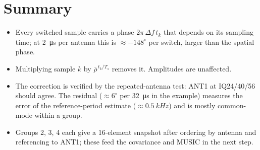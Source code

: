 \documentclass[11pt,a4paper]{article}
\begin{document}
\section{Summary}
\begin{itemize}
  \item Every switched sample carries a phase $2\pi\,\Delta f\,t_k$ that depends on its sampling time; at \SI{2}{\micro s} per antenna this is $\approx -148^\circ$ per switch, larger than the spatial phase.
  \item Multiplying sample $k$ by $\bar\rho^{\,t_k/T_s}$ removes it. Amplitudes are unaffected.
  \item The correction is verified by the repeated-antenna test: ANT1 at IQ24/40/56 should agree. The residual ($\approx 6^\circ$ per \SI{32}{\micro s} in the example) measures the error of the reference-period estimate ($\approx\SI{0.5}{kHz}$) and is mostly common-mode within a group.
  \item Groups 2, 3, 4 each give a 16-element snapshot after ordering by antenna and referencing to ANT1; these feed the covariance and MUSIC in the next step.
\end{itemize}
\end{document}
